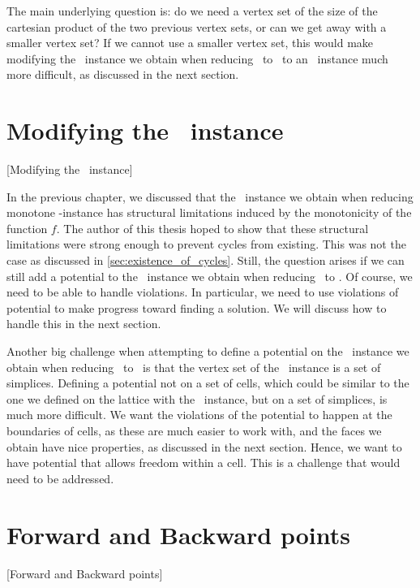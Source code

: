 The main underlying question is: do we need a vertex set of the size of the cartesian product of the two previous vertex sets, or can we get away with a smaller vertex set? If we cannot use a smaller vertex set, this would make modifying the \EndOfLine\ instance we obtain when reducing \Tarskistar\ to \EndOfLine\ to an \EndOfPotentialLine\ instance much more difficult, as discussed in the next section.

\section{Modifying the \EndOfLine\ instance}[Modifying the \EndOfLine\ instance]

In the previous chapter, we discussed that the \EndOfLine\ instance we obtain when reducing monotone \Tarskistar-instance has structural limitations induced by the monotonicity of the function $f$. The author of this thesis hoped to show that these structural limitations were strong enough to prevent cycles from existing. This was not the case as discussed in \cref{sec:existence_of_cycles}. Still, the question arises if we can still add a potential to the \EndOfLine\ instance we obtain when reducing \Tarskistar\ to \EndOfLine\@. Of course, we need to be able to handle violations. In particular, we need to use violations of potential to make progress toward finding a solution. We will discuss how to handle this in the next section.

Another big challenge when attempting to define a potential on the \EndOfLine\ instance we obtain when reducing \Tarskistar\ to \EndOfLine\ is that the vertex set of the \EndOfLine\ instance is a set of simplices. Defining a potential not on a set of cells, which could be similar to the one we defined on the lattice with the \Localopt\ instance, but on a set of simplices, is much more difficult. We want the violations of the potential to happen at the boundaries of cells, as these are much easier to work with, and the faces we obtain have nice properties, as discussed in the next section. Hence, we want to have potential that allows freedom within a cell. This is a challenge that would need to be addressed.

\section{Forward and Backward points}[Forward and Backward points]

